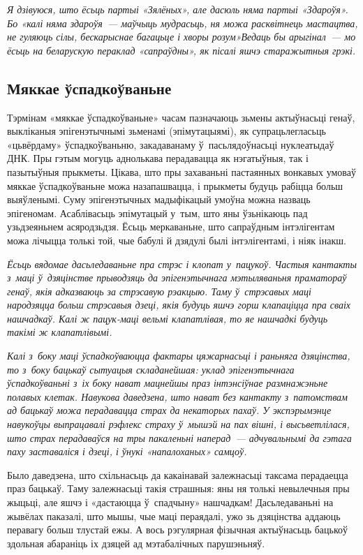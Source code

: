 \emph{Я дзівуюся, што ёсьць партыі «Зялёных», але дасюль няма партыі «Здароўя». Бо «калі няма здароўя~--- маўчыць мудрасьць, ня можа расквітнець мастацтва, не гуляюць сілы, бескарыснае багацьце і хворы розум»Ведаць бы арыгінал~--- мо ёсьць на беларускую пераклад «сапраўдны», як пісалі яшчэ старажытныя грэкі.}

\subsection*{Мяккае ўспадкоўваньне}

Тэрмінам «мяккае ўспадкоўваньне» часам пазначаюць зьмены актыўнасьці генаў, выкліканыя эпігенэтычнымі зьменамі (эпімутацыямі), як супрацьлегласьць «цьвёрдаму» ўспадкоўваньню, закадаванаму ў~пасьлядоўнасьці нуклеатыдаў ДНК. Пры гэтым могуць аднолькава перадавацца як нэгатыўныя, так і пазытыўныя прыкметы. Цікава, што пры захаваньні пастаянных вонкавых умоваў мяккае ўспадкоўваньне можа назапашвацца, і прыкметы будуць рабіцца больш выяўленымі. Суму эпігенэтычных мадыфікацый умоўна можна назваць эпігеномам. Асаблівасьць эпімутацый у~тым, што яны ўзьнікаюць пад узьдзеяньнем асяродзьдзя. Ёсьць меркаваньне, што сапраўдным інтэлігентам можа лічыцца толькі той, чые бабулі й дзядулі былі інтэлігентамі, і ніяк інакш.

\emph{Ёсьць вядомае дасьледаваньне пра стрэс і клопат у~пацукоў. Частыя кантакты з~маці ў~дзяцінстве прыводзяць да эпігенэтычнага мэтыляваньня праматораў генаў, якія адказваюць за стрэсавую рэакцыю. Таму ў~стрэсавых маці народзяцца больш стрэсавыя дзеці, якія будуць яшчэ горш клапаціцца пра сваіх нашчадкаў. Калі ж пацук-маці вельмі клапатлівая, то яе нашчадкі будуць такімі ж клапатлівымі.}

\emph{Калі з~боку маці ўспадкоўваюцца фактары цяжарнасьці і раньняга дзяцінства, то з~боку бацькаў сытуацыя складанейшая: уклад эпігенэтычнага ўспадкоўваньні з~іх боку нават мацнейшы праз інтэнсіўнае размнажэньне полавых клетак. Навукова даведзена, што нават без кантакту з~патомствам ад бацькаў можа перадавацца страх да некаторых пахаў. У экспэрымэнце навукоўцы выпрацавалі рэфлекс страху ў~мышэй на пах вішні, і высьветлілася, што страх перадаваўся на тры пакаленьні наперад~--- адчувальнымі да гэтага паху заставаліся і дзеці, і ўнукі «напалоханых» самцоў.}

Было даведзена, што схільнасьць да какаінавай залежнасьці таксама перадаецца праз бацькаў. Таму залежнасьці такія страшныя: яны ня толькі невылечныя пры жыцьці, але яшчэ і «дастаюцца ў~спадчыну» нашчадкам! Дасьледаваньні на жывёлах паказалі, што мышы, чые маці пераядалі, ужо зь дзяцінства аддаюць перавагу больш тлустай ежы. А вось рэгулярная фізычная актыўнасьць бацькоў здольная абараніць іх дзяцей ад мэтабалічных парушэньняў.

